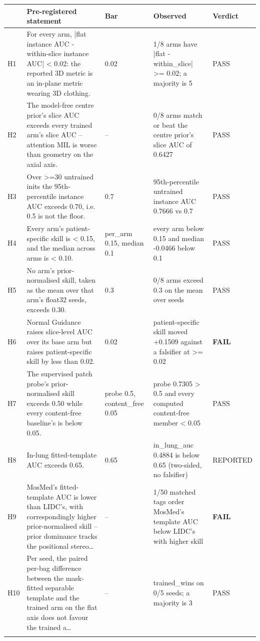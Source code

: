 \begin{longtable}{@{}p{0.5cm}p{5.4cm}p{1.9cm}p{5.4cm}p{1.5cm}@{}}
\toprule
& Pre-registered statement & Bar & Observed & Verdict \\
\midrule
\endhead
H1 & For every arm, |flat instance AUC - within-slice instance AUC| \textless{} 0.02: the reported 3D metric is an in-plane metric wearing 3D clothing. & 0.02 & 1/8 arms have |flat - within\_slice| \textgreater{}= 0.02; a majority is 5 & PASS \\
\addlinespace[2pt]
H2 & The model-free centre prior's slice AUC exceeds every trained arm's slice AUC -- attention MIL is worse than geometry on the axial axis. & -- & 0/8 arms match or beat the centre prior's slice AUC of 0.6427 & PASS \\
\addlinespace[2pt]
H3 & Over \textgreater{}=30 untrained inits the 95th-percentile instance AUC exceeds 0.70, i.e. 0.5 is not the floor. & 0.7 & 95th-percentile untrained instance AUC 0.7666 vs 0.7 & PASS \\
\addlinespace[2pt]
H4 & Every arm's patient-specific skill is \textless{} 0.15, and the median across arms is \textless{} 0.10. & per\_arm 0.15, median 0.1 & every arm below 0.15 and median -0.0466 below 0.1 & PASS \\
\addlinespace[2pt]
H5 & No arm's prior-normalised skill, taken as the mean over that arm's float32 seeds, exceeds 0.30. & 0.3 & 0/8 arms exceed 0.3 on the mean over seeds & PASS \\
\addlinespace[2pt]
H6 & Normal Guidance raises slice-level AUC over its base arm but raises patient-specific skill by less than 0.02. & 0.02 & patient-specific skill moved +0.1509 against a falsifier at \textgreater{}= 0.02 & \textbf{FAIL} \\
\addlinespace[2pt]
H7 & The supervised patch probe's prior-normalised skill exceeds 0.50 while every content-free baseline's is below 0.05. & probe 0.5, content\_free 0.05 & probe 0.7305 \textgreater{} 0.5 and every computed content-free member \textless{} 0.05 & PASS \\
\addlinespace[2pt]
H8 & In-lung fitted-template AUC exceeds 0.65. & 0.65 & in\_lung\_auc 0.4884 is below 0.65 (two-sided, no falsifier) & REPORTED \\
\addlinespace[2pt]
H9 & MosMed's fitted-template AUC is lower than LIDC's, with correspondingly higher prior-normalised skill -- prior dominance tracks the positional stereo… & -- & 1/50 matched tags order MosMed's template AUC below LIDC's with higher skill & \textbf{FAIL} \\
\addlinespace[2pt]
H10 & Per seed, the paired per-bag difference between the mask-fitted separable template and the trained arm on the flat axis does not favour the trained a… & -- & trained\_wins on 0/5 seeds; a majority is 3 & PASS \\
\addlinespace[2pt]
\bottomrule
\end{longtable}
